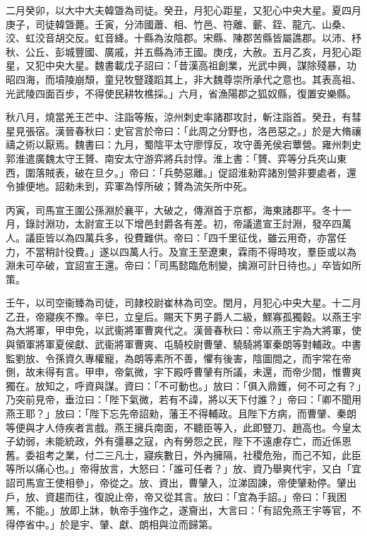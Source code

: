 \begin{pinyinscope}
二月癸卯，以大中大夫韓曁為司徒。癸丑，月犯心距星，又犯心中央大星。夏四月庚子，司徒韓曁薨。壬寅，分沛國蕭、相、竹邑、符離、蘄、銍、龍亢、山桑、洨、虹洨音胡交反。虹音絳。十縣為汝陰郡。宋縣、陳郡苦縣皆屬譙郡。以沛、杼秋、公丘、彭城豐國、廣戚，并五縣為沛王國。庚戌，大赦。五月乙亥，月犯心距星，又犯中央大星。魏書載戊子詔曰：「昔漢高祖創業，光武中興，謀除殘暴，功昭四海，而墳陵崩頹，童兒牧豎踐蹈其上，非大魏尊崇所承代之意也。其表高祖、光武陵四面百步，不得使民耕牧樵採。」六月，省漁陽郡之狐奴縣，復置安樂縣。

秋八月，燒當羌王芒中、注詣等叛，涼州刺史率諸郡攻討，斬注詣首。癸丑，有彗星見張宿。漢晉春秋曰：史官言於帝曰：「此周之分野也，洛邑惡之。」於是大脩禳禱之術以厭焉。魏書曰：九月，蜀陰平太守廖惇反，攻守善羌侯宕蕈營。雍州刺史郭淮遣廣魏太守王贇、南安太守游弈將兵討惇。淮上書：「贇、弈等分兵夾山東西，圍落賊表，破在旦夕。」帝曰：「兵勢惡離。」促詔淮勑弈諸別營非要處者，還令據便地。詔勑未到，弈軍為惇所破；贇為流矢所中死。

丙寅，司馬宣王圍公孫淵於襄平，大破之，傳淵首于京都，海東諸郡平。冬十一月，錄討淵功，太尉宣王以下增邑封爵各有差。初，帝議遣宣王討淵，發卒四萬人。議臣皆以為四萬兵多，役費難供。帝曰：「四千里征伐，雖云用奇，亦當任力，不當稍計役費。」遂以四萬人行。及宣王至遼東，霖雨不得時攻，羣臣或以為淵未可卒破，宜詔宣王還。帝曰：「司馬懿臨危制變，擒淵可計日待也。」卒皆如所策。

壬午，以司空衞臻為司徒，司隷校尉崔林為司空。閏月，月犯心中央大星。十二月乙丑，帝寢疾不豫。辛巳，立皇后。賜天下男子爵人二級，鰥寡孤獨穀。以燕王宇為大將軍，甲申免，以武衞將軍曹爽代之。漢晉春秋曰：帝以燕王宇為大將軍，使與領軍將軍夏侯獻、武衞將軍曹爽、屯騎校尉曹肈、驍騎將軍秦朗等對輔政。中書監劉放、令孫資久專權寵，為朗等素所不善，懼有後害，陰圖間之，而宇常在帝側，故未得有言。甲申，帝氣微，宇下殿呼曹肈有所議，未還，而帝少間，惟曹爽獨在。放知之，呼資與謀。資曰：「不可動也。」放曰：「俱入鼎鑊，何不可之有？」乃突前見帝，垂泣曰：「陛下氣微，若有不諱，將以天下付誰？」帝曰：「卿不聞用燕王耶？」放曰：「陛下忘先帝詔勑，藩王不得輔政。且陛下方病，而曹肈、秦朗等便與才人侍疾者言戲。燕王擁兵南面，不聽臣等入，此即豎刀、趙高也。今皇太子幼弱，未能統政，外有彊暴之寇，內有勞怨之民，陛下不遠慮存亡，而近係恩舊。委祖考之業，付二三凡士，寢疾數日，外內擁隔，社稷危殆，而己不知，此臣等所以痛心也。」帝得放言，大怒曰：「誰可任者？」放、資乃舉爽代宇，又白「宜詔司馬宣王使相參」，帝從之。放、資出，曹肈入，泣涕固諫，帝使肈勑停。肈出戶，放、資趨而往，復說止帝，帝又從其言。放曰：「宜為手詔。」帝曰：「我困篤，不能。」放即上牀，執帝手強作之，遂齎出，大言曰：「有詔免燕王宇等官，不得停省中。」於是宇、肈、獻、朗相與泣而歸第。


\end{pinyinscope}
